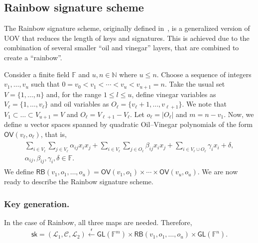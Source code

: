 \documentclass[12pt, a4paper, oneside]{memoir}
\newcommand{\random}{\overset{\mathsf{r}}{\gets}}
\theoremstyle{definition}
\begin{document}
\subsection{Rainbow signature scheme}\label{subsec:rainbow}

The Rainbow signature scheme, originally defined in~\cite{Ding:200506}, is a generalized version of UOV that reduces the length of keys and signatures. This is achieved due to the combination of several smaller ``oil and vinegar'' layers, that are combined to create a ``rainbow''.

Consider a finite field $\mathbb{F}$ and $u, n \in \mathbb{N}$ where $u \leq n$. Choose a sequence of integers $v_{1}, \dots, v_{u}$ such that $0 = v_{0} < v_{1} < \cdots < v_{u} < v_{u + 1} = n$. Take the usual set $V = \{1, \dots, n\}$ and, for the range $1 \leq l \leq u$, define vinegar variables as $V_{\ell} = \{1, \dots, v_{\ell}\}$ and oil variables as $O_{\ell} = \{v_{\ell} + 1, \dots, v_{\ell + 1}\}$. We note that $V_{1} \subset \dots \subset V_{u + 1} = V$ and $O_{\ell} = V_{\ell + 1} - V_{\ell}$. Let $o_{\ell} = |O_{\ell}|$ and $m = n - v_{1}$. Now, we define $u$ vector spaces spanned by quadratic Oil--Vinegar polynomials of the form $\mathsf{OV}(v_{\ell}, o_{\ell})$, that is,
\begin{align}\label{eq:ov}
  \begin{split}
    \sum_{i \in V_{\ell}} \sum_{j \in V_{\ell}} \alpha_{ij} x_{i} x_{j}
      + \sum_{i \in V_{\ell}} \sum_{j \in O_{\ell}} \beta_{ij} x_{i} x_{j}
      + \sum_{i \in V_{\ell} \cup O_{\ell}} \gamma_{i} x_{i} + \delta, \\
      \alpha_{ij}, \beta_{ij}, \gamma_{i}, \delta \in \mathbb{F}.
  \end{split}
\end{align}
We define $\mathsf{RB}(v_{1}, o_{1}, \dots, o_{u}) = \mathsf{OV}(v_{1}, o_{1}) \times \cdots \times \mathsf{OV}(v_{u}, o_{u})$. We are now ready to describe the Rainbow signature scheme.

\subsubsection{Key generation.}

In the case of Rainbow, all three maps are needed. Therefore,
\begin{align}
  \mathsf{sk} = (\mathcal{L}_{1}, \mathcal{C}, \mathcal{L}_{2}) 
    \random \mathsf{GL}(\mathbb{F}^{m}) \times \mathsf{RB}(v_{1}, o_{1}, \dots, o_{u}) \times \mathsf{GL}(\mathbb{F}^{n}).
\end{align}
\end{document}
